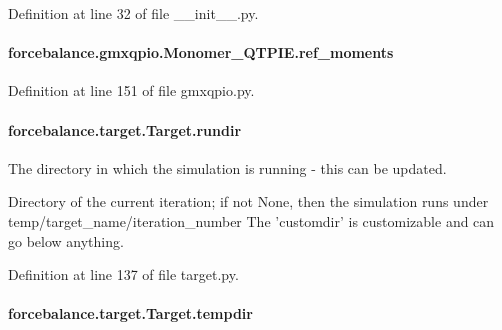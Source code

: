 Definition at line 32 of file \-\_\-\-\_\-init\-\_\-\-\_\-.\-py.

\hypertarget{classforcebalance_1_1gmxqpio_1_1Monomer__QTPIE_a17de0cabe736ba52ae17f8476db7d35a}{
\paragraph[{ref\-\_\-moments}]{\setlength{\rightskip}{0pt plus 5cm}forcebalance.\-gmxqpio.\-Monomer\-\_\-\-Q\-T\-P\-I\-E.\-ref\-\_\-moments}}\label{classforcebalance_1_1gmxqpio_1_1Monomer__QTPIE_a17de0cabe736ba52ae17f8476db7d35a}


Definition at line 151 of file gmxqpio.\-py.

\hypertarget{classforcebalance_1_1target_1_1Target_a6872de5b2d4273b82336ea5b0da29c9e}{
\paragraph[{rundir}]{\setlength{\rightskip}{0pt plus 5cm}forcebalance.\-target.\-Target.\-rundir\hspace{0.3cm}{\ttfamily [inherited]}}}\label{classforcebalance_1_1target_1_1Target_a6872de5b2d4273b82336ea5b0da29c9e}


The directory in which the simulation is running -\/ this can be updated. 

Directory of the current iteration; if not None, then the simulation runs under temp/target\-\_\-name/iteration\-\_\-number The 'customdir' is customizable and can go below anything.

Definition at line 137 of file target.\-py.

\hypertarget{classforcebalance_1_1target_1_1Target_aa1f01b5b78db253b5b66384ed11ed193}{
\paragraph[{tempdir}]{\setlength{\rightskip}{0pt plus 5cm}forcebalance.\-target.\-Target.\-tempdir\hspace{0.3cm}{\ttfamily [inherited]}}}\label{classforcebalance_1_1target_1_1Target_aa1f01b5b78db253b5b66384ed11ed193}


